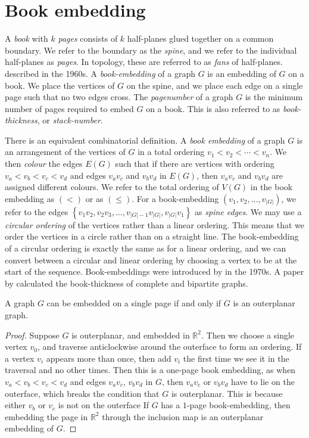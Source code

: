 \section{Book embedding}\label{sec:Book Embedding}
A \textit{book} with \(k\) \textit{pages} consists of \(k\) half-planes glued together on a common boundary. We refer to the boundary as the \textit{spine}, and we refer to the individual half-planes as \textit{pages}. In topology, these are referred to as \textit{fans} of half-planes. \textcite{persingerSubsetsNbooksE31966,atneosenOnedimensionalNleavedContinua1972} described in the 1960s.
A \textit{book-embedding} of a graph \(G\) is an embedding of \(G\) on a book. We place the vertices of \(G\) on the spine, and we place each edge on a single page such that no two edges cross.
The \textit{pagenumber} of a graph \(G\) is the minimum number of pages required to embed \(G\) on a book. This is also referred to as \textit{book-thickness}, or \textit{stack-number}.
\par
There is an equivalent combinatorial definition. A \textit{book embedding} of a graph \(G\) is an arrangement of the vertices of \(G\) in a total ordering \(v_1 < v_2 < \cdots < v_n\). We then \textit{colour} the edges \(E(G)\) such that if there are vertices with ordering \(v_a < v_b < v_c < v_d\) and edges \(v_a v_c\) and \(v_b v_d\) in $E(G)$, then $v_a v_c$ and $v_b v_d$ are assigned different colours.
We refer to the total ordering of \(V(G)\) in the book embedding as \((<)\) or as \((\leq)\). For a book-embedding \((v_1, v_2, \ldots, v_{|G|})\), we refer to the edges \( \left\{ v_1 v_2, v_2 v_3, \ldots, v_{|G| - 1}v_{|G|}, v_{|G|}v_{1} \right\} \) as \textit{spine edges}.
We may use a \textit{circular ordering} of the vertices rather than a linear ordering. This means that we order the vertices in a circle rather than on a straight line. The book-embedding of a circular ordering is exactly the same as for a linear ordering, and we can convert between a circular and linear ordering by choosing a vertex to be at the start of the sequence.
Book-embeddings were introduced by \textcite{kainenRecentResultsTopological1974, ollmannBookThicknessVarious1973} in the 1970s. A paper by \textcite{bernhartBookThicknessGraph1979} calculated the book-thickness of complete and bipartite graphs.
\begin{lemma}\label{lem:Pagenumber_1}
	A graph \(G\) can be embedded on a single page if and only if \(G\) is an outerplanar graph.
\end{lemma}
\begin{proof}
	Suppose $G$ is outerplanar, and embedded in $\mathbb{R}^2$. Then we choose a single vertex $v_0$, and traverse anticlockwise around the outerface to form an ordering. If a vertex $v_i$ appears more than once, then add $v_i$ the first time we see it in the traversal and no other times. Then this is a one-page book embedding, as when $v_a < v_b < v_c < v_d$ and edges $v_a v_c$, $v_b v_d$ in $G$, then $v_a v_c$ or $v_b v_d$ have to lie on the outerface, which breaks the condition that $G$ is outerplanar. This is because either $v_b$ or $v_c$ is not on the outerface If $G$ has a $1$-page book-embedding, then embedding the page in $\mathbb{R}^2$ through the inclusion map is an outerplanar embedding of $G$. 
\end{proof}
